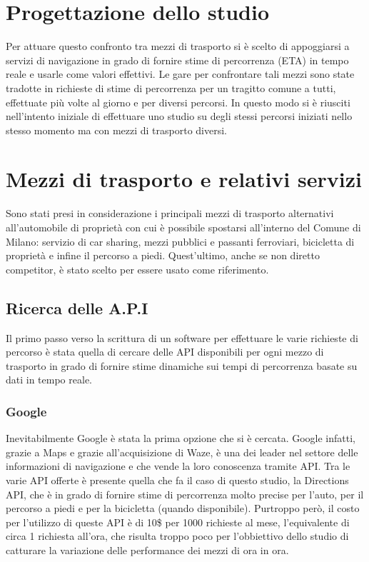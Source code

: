 \section{Progettazione dello studio}

Per attuare questo confronto tra mezzi di trasporto si è scelto di appoggiarsi a servizi di navigazione in grado di fornire stime di percorrenza (ETA) in tempo reale e usarle come valori effettivi. Le gare per confrontare tali mezzi sono state tradotte in richieste di stime di percorrenza per un tragitto comune a tutti, effettuate più volte al giorno e per diversi percorsi. In questo modo si è riusciti nell'intento iniziale di effettuare uno studio su degli stessi percorsi iniziati nello stesso momento ma con mezzi di trasporto diversi.

\section{Mezzi di trasporto e relativi servizi}

Sono stati presi in considerazione i principali mezzi di trasporto alternativi all'automobile di proprietà con cui è possibile spostarsi all'interno del Comune di Milano: servizio di car sharing, mezzi pubblici e passanti ferroviari, bicicletta di proprietà e infine il percorso a piedi. Quest'ultimo, anche se non diretto competitor, è stato scelto per essere usato come riferimento.

\subsection{Ricerca delle A.P.I}

Il primo passo verso la scrittura di un software per effettuare le varie richieste di percorso è stata quella di cercare delle API disponibili per ogni mezzo di trasporto in grado di fornire stime dinamiche sui tempi di percorrenza basate su dati in tempo reale.

\subsubsection{Google}

Inevitabilmente Google è stata la prima opzione che si è cercata. Google infatti, grazie a Maps e grazie all'acquisizione di Waze\cite{googleblog}, è una dei leader nel settore delle informazioni di navigazione e che vende la loro conoscenza tramite API. Tra le varie API offerte è presente quella che fa il caso di questo studio, la Directions API, che è in grado di fornire stime di percorrenza molto precise per l'auto, per il percorso a piedi e per la bicicletta (quando disponibile)\cite{googleapi}. Purtroppo però, il costo per l'utilizzo di queste API è di 10\$ per 1000 richieste al mese, l'equivalente di circa 1 richiesta all'ora, che risulta troppo poco per l'obbiettivo dello studio di catturare la variazione delle performance dei mezzi di ora in ora\cite{googleapiprice}.

